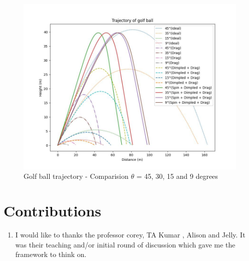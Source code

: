 \documentclass[11pt]{article}
\begin{document}
\begin{figure}[b]
    \centering
    \includegraphics[width=\textwidth, height=\textheight, keepaspectratio]{Golf_Trajectory.jpeg}
    \caption{Golf ball trajectory - Comparision $\theta$ = 45, 30, 15 and 9 degrees}
    \label{fig:trajectory}
\end{figure}
\section{Contributions}
\begin{enumerate}
    \item I would like to thanks the professor corey, TA Kumar , Alison and Jelly. It was their  teaching and/or initial round of discussion which gave me the framework to think on.
\end{enumerate}

  
\end{document}

